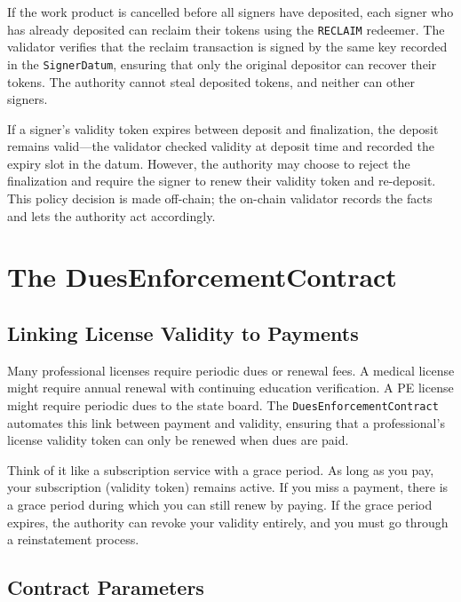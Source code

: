 If the work product is cancelled before all signers have deposited, each
signer who has already deposited can reclaim their tokens using the
\texttt{RECLAIM} redeemer. The validator verifies that the reclaim
transaction is signed by the same key recorded in the
\texttt{SignerDatum}, ensuring that only the original depositor can
recover their tokens. The authority cannot steal deposited tokens, and
neither can other signers.

If a signer's validity token expires between deposit and finalization,
the deposit remains valid---the validator checked validity at deposit
time and recorded the expiry slot in the datum. However, the authority
may choose to reject the finalization and require the signer to renew
their validity token and re-deposit. This policy decision is made
off-chain; the on-chain validator records the facts and lets the
authority act accordingly.


\section{The DuesEnforcementContract}
\label{sec:dues-enforcement}

\subsection{Linking License Validity to Payments}

Many professional licenses require periodic dues or renewal fees. A
medical license might require annual renewal with continuing education
verification. A PE license might require periodic dues to the state
board. The \texttt{DuesEnforcementContract} automates this link between
payment and validity, ensuring that a professional's license validity
token can only be renewed when dues are paid.

Think of it like a subscription service with a grace period. As long as
you pay, your subscription (validity token) remains active. If you miss
a payment, there is a grace period during which you can still renew by
paying. If the grace period expires, the authority can revoke your
validity entirely, and you must go through a reinstatement process.

\subsection{Contract Parameters}

